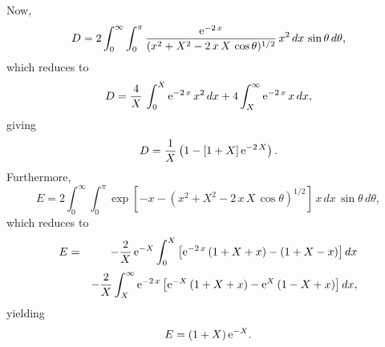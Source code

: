 Now,
\begin{equation}
D = 2\int_0^\infty\int_0^\pi \frac{{\rm e}^{-2\,x}}{(x^2+X^2-2\,x\,X\,\cos\theta)^{1/2}}\,x^2\,dx\,\sin\theta\,d\theta,
\end{equation}
which reduces to
\begin{equation}
D =\frac{4}{X}\,\int_0^X {\rm e}^{-2\,x}\,x^2\,dx
+ 4\int_X^\infty {\rm e}^{-2\,x}\,x\,dx,
\end{equation}
giving
\begin{equation}\label{e14.75}
D = \frac{1}{X} \left( 1-[1+X]\,{\rm e}^{-2\,X}\right).
\end{equation}
Furthermore, 
\begin{equation}
E = 2\int_0^\infty \int_0^\pi \exp\left[-x-(x^2+X^2-2\,x\,X\,\cos\theta)^{1/2}\right]\,x\,dx\,\sin\theta\,d\theta,
\end{equation}
which reduces to
\begin{eqnarray}
E&=& - \frac{2}{X}\,{\rm e}^{-X}\int_0^X \left[{\rm e}^{-2\,x}\,(1+X+x)-
(1+X-x)\right]dx\nonumber\\[0.5ex]
&&-\frac{2}{X}\int_X^\infty {\rm e}^{-2\,x}\left[{\rm e}^{-X}\,(1+X+x)-
{\rm e}^X\,(1-X+x)\right] dx,
\end{eqnarray}
yielding
\begin{equation}\label{e14.78}
E = (1+X)\,{\rm e}^{-X}.
\end{equation}

